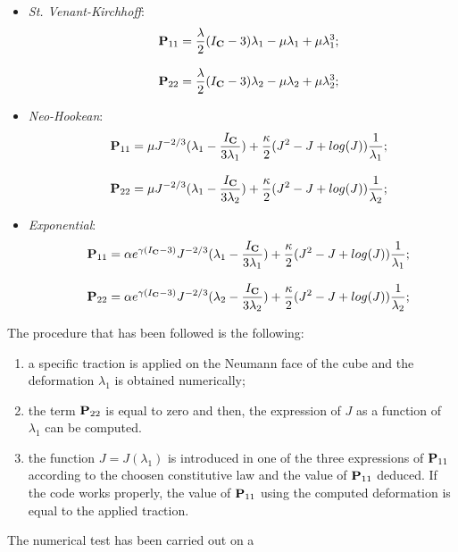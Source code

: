 \begin{itemize}
  \item \textit{St. Venant-Kirchhoff}:
    \begin{equation}
      \begin{array}{lll} & \textbf{P}_{11}=\displaystyle
\frac{\lambda}{2}(I_{\textbf{C}}-3)\lambda_1 - \mu\lambda_1 +
\mu\lambda_1^3;\\ \\ & \textbf{P}_{22}=\displaystyle
\frac{\lambda}{2}(I_{\textbf{C}}-3)\lambda_2 - \mu\lambda_2 + \mu\lambda_2^3;
      \end{array}
      \label{eq::P11SVK}
    \end{equation}
  \item \textit{Neo-Hookean}:
    \begin{equation}
      \begin{array}{lll} & \textbf{P}_{11}=\displaystyle \mu J^{-2/3}
(\lambda_1 - \frac{I_{\textbf{C}}}{3\lambda_1}) + \frac{\kappa}{2}(J^2 - J +
log(J))\frac{1}{\lambda_1};\\ \\ & \textbf{P}_{22}=\displaystyle \mu
J^{-2/3} (\lambda_1 - \frac{I_{\textbf{C}}}{3\lambda_2}) +
\frac{\kappa}{2}(J^2 - J + log(J))\frac{1}{\lambda_2};
      \end{array}
      \label{eq::P11NH}
    \end{equation}
  \item \textit{Exponential}:
    \begin{equation}
      \begin{array}{lll} & \textbf{P}_{11}=\displaystyle \alpha e^{\gamma\left(I_{\textbf{C}}-3\right)}
J^{-2/3}(\lambda_1 - \frac{I_{\textbf{C}}}{3\lambda_1})+\frac{\kappa}{2}(J^2 -
J + log(J))\frac{1}{\lambda_1};\\ \\ & \textbf{P}_{22}=\displaystyle
\alpha e^{\gamma\left(I_{\textbf{C}}-3\right)} J^{-2/3}(\lambda_2 -
\frac{I_{\textbf{C}}}{3\lambda_2})+\frac{\kappa}{2}(J^2 - J +
log(J))\frac{1}{\lambda_2};
      \end{array}
      \label{eq::P11EXP}
    \end{equation}
\end{itemize} The procedure that has been followed is the following:
\begin{enumerate}
  \item a specific traction is applied on the Neumann face of the cube
and the deformation $\lambda_1$ is obtained numerically;
  \item the term $\textbf{P}_{22}$ is equal to zero and then, the
expression of $J$ as a function of $\lambda_1$ can be computed.
  \item the function $J=J(\lambda_1)$ is introduced in one of the
three expressions of $\textbf{P}_{11}$ according to the choosen
constitutive law and the value of $\textbf{P}_{11}$ deduced. If the code
works properly, the value of $\textbf{P}_{11}$ using the computed
deformation is equal to the applied traction.
\end{enumerate} The numerical test has been carried out on a
